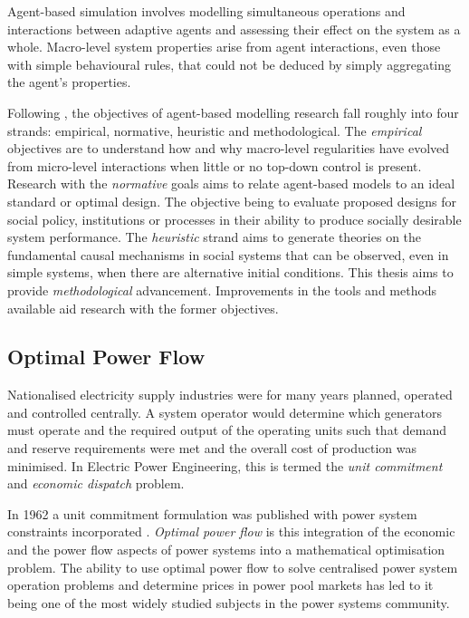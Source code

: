 Agent-based simulation involves modelling simultaneous operations and
interactions between adaptive agents and assessing their effect on the system
as a whole.  Macro-level system properties arise from agent interactions, even
those with simple behavioural rules, that could not be deduced by simply
aggregating the agent's properties. %

Following , the objectives of agent-based modelling
research fall roughly into four strands: empirical, normative, heuristic and
methodological. The \textit{empirical} objectives are to understand how and why macro-level
regularities have evolved from micro-level interactions when little or no
top-down control is present.  Research with the \textit{normative} goals aims
to relate agent-based models to an ideal standard or optimal design.  The objective being
to evaluate proposed designs for social policy, institutions or processes in
their ability to produce socially desirable system performance.  The
\textit{heuristic} strand aims to generate theories on the fundamental causal
mechanisms in social systems that can be observed, even in simple systems, when there are
alternative initial conditions.  This thesis aims to provide
\textit{methodological} advancement.  Improvements in the tools and methods
available aid research with the former objectives.

\subsection{Optimal Power Flow}
\label{sec:opf}
Nationalised electricity supply industries were for many years planned,
operated and controlled centrally.  A system operator would determine which
generators must operate and the required output of the operating units such
that demand and reserve requirements were met and the overall cost of
production was minimised.  In Electric Power Engineering, this is termed the
\textit{unit commitment} and \textit{economic dispatch} problem.

In 1962 a unit commitment formulation was published with power system
constraints incorporated \cite{carpentier:opf}.  \textit{Optimal power flow} is
this integration of the economic and the power flow aspects of power systems into a
mathematical optimisation problem.  The ability to use optimal power flow to
solve centralised power system operation problems and determine prices in power
pool markets has led to it being one of the most widely studied subjects in
the power systems community.

